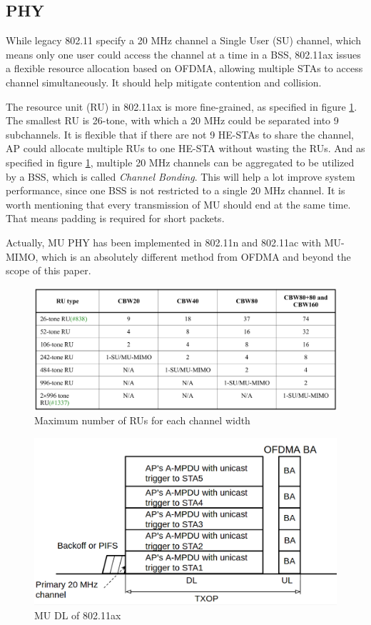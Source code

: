 \documentclass[journal]{IEEEtran}
\begin{document}
\subsection{PHY}
While legacy 802.11 specify a 20 MHz channel a Single User (SU) channel, which means only one user could access the channel at a time in a BSS, 802.11ax issues a flexible resource allocation based on OFDMA, allowing multiple STAs to access channel simultaneously.
It should help mitigate contention and collision. 

The resource unit (RU) in 802.11ax is more fine-grained, as specified in figure \ref{fig_RU_spec}. The smallest RU is 26-tone, with which a 20 MHz could be separated into 9 subchannels.
It is flexible that if there are not 9 HE-STAs to share the channel, AP could allocate multiple RUs to one HE-STA without wasting the RUs.
And as specified in figure \ref{fig_RU_spec}, multiple 20 MHz channels can be aggregated to be utilized by a BSS, which is called \textit{Channel Bonding}. 
This will help a lot improve system performance, since one BSS is not restricted to a single 20 MHz channel.  
It is worth mentioning that every transmission of MU should end at the same time. That means padding is required for short packets.



Actually, MU PHY has been implemented in 802.11n and 802.11ac with MU-MIMO, which is an absolutely different method from OFDMA and beyond the scope of this paper. 

\begin{figure}[!t]
\includegraphics[scale=0.14]{./figure/RU_spec.png}
\caption{Maximum number of RUs for each channel width}
\label{fig_RU_spec}
\end{figure}


\begin{figure}[!t]
\includegraphics[scale=0.23]{./figure/fig_MU_DL.png}
\caption{MU DL of 802.11ax}
\label{fig_MU_DL}
\end{figure}
\end{document}
